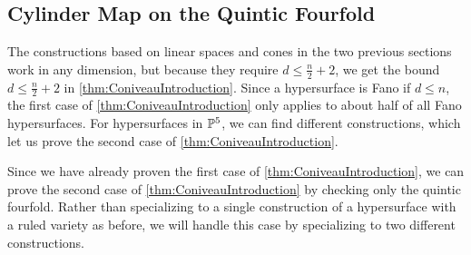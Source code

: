 \subsection{Cylinder Map on the Quintic Fourfold}
\label{sec:Fourfolds}
The constructions based on linear spaces and cones in the two previous sections work in any dimension, but because they require $d\leq \frac{n}{2}+2$, we get the bound $d \leq \frac{n}{2}+2$ in \cref{thm:ConiveauIntroduction}. Since a hypersurface is Fano if $d \leq n$, the first case of \cref{thm:ConiveauIntroduction} only applies to about half of all Fano hypersurfaces. For hypersurfaces in $\P^5$, we can find different constructions, which let us prove the second case of \cref{thm:ConiveauIntroduction}.

Since we have already proven the first case of \cref{thm:ConiveauIntroduction}, we can prove the second case of \cref{thm:ConiveauIntroduction} by checking only the quintic fourfold. Rather than specializing to a single construction of a hypersurface with a ruled variety as before, we will handle this case by specializing to two different constructions.

